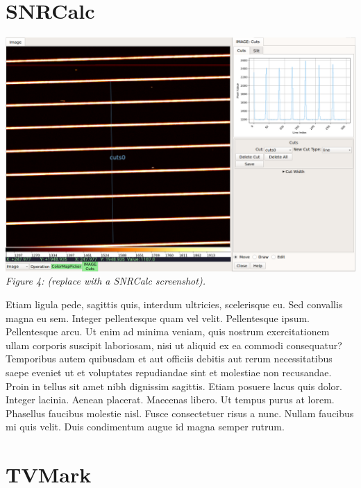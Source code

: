 \documentclass[]{article}
\begin{document}
\begin{multicols}{3}
\section*{SNRCalc}

\para
\begin{center}
\includegraphics[width=8in]{plugin_cuts} \\
\vspace*{0.4em}
\label{fig:plugin_cuts}
{\small\em Figure 4: (replace with a SNRCalc screenshot).} 
\end{center}

\para
Etiam ligula pede, sagittis quis, interdum ultricies, scelerisque
eu. Sed convallis magna eu sem. Integer pellentesque quam vel
velit. Pellentesque ipsum. Pellentesque arcu. Ut enim ad minima veniam,
quis nostrum exercitationem ullam corporis suscipit laboriosam, nisi ut
aliquid ex ea commodi consequatur? Temporibus autem quibusdam et aut
officiis debitis aut rerum necessitatibus saepe eveniet ut et voluptates
repudiandae sint et molestiae non recusandae. Proin in tellus sit amet
nibh dignissim sagittis. Etiam posuere lacus quis dolor. Integer
lacinia. Aenean placerat. Maecenas libero. Ut tempus purus at
lorem. Phasellus faucibus molestie nisl. Fusce consectetuer risus a
nunc. Nullam faucibus mi quis velit. Duis condimentum augue id magna
semper rutrum. 

\section*{TVMark}


\end{multicols}
\end{document}
